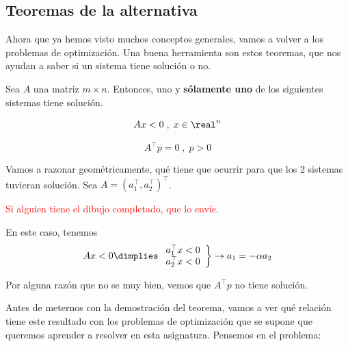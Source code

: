 \subsection{Teoremas de la alternativa}

Ahora que ya hemos visto muchos conceptos generales, vamos a volver a los problemas de optimización.
Una buena herramienta son estos teoremas, que nos ayudan a saber si un sistema tiene solución o no.

\begin{lemma}
Sea $A$ una matriz $m\times n$. Entonces, uno y \textbf{sólamente uno} de los siguientes sistemas tiene solución.

\begin{equation}
Ax < 0\;,\; x\in\real^n
\label{eq:Gordan_1}
\end{equation}

\begin{equation}
A^\top p = 0\;,\; p > 0
\label{eq:Gordan_2}
\end{equation}
\end{lemma}


Vamos a razonar geométricamente, qué tiene que ocurrir para que los 2 sistemas tuvieran solución. Sea $A = (a_1^\top,a_2^\top)^\top$.

\textcolor{red}{Si alguien tiene el dibujo completado, que lo envíe.}

\begin{figure}[h]
\centering
{}
\end{figure}

En este caso, tenemos \[Ax < 0 \dimplies \left.\begin{array}{c}a_1^\top x < 0\\a_2^\top x<0\end{array}\right\} \to a_1 = -\alpha a_2\]


Por alguna razón que no se muy bien, vemos que $A^\top p$ no tiene solución.


Antes de meternos con la demostración del teorema, vamos a ver qué relación tiene este resultado con los problemas de optimización que se supone que queremos aprender a resolver en esta asignatura.
Pensemos en el problema:
\begin{ioprob}
\end{ioprob}

